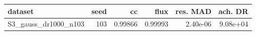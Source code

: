 \begin{tabular}{lrrrrr}
\toprule
dataset & seed & cc & flux & res. MAD & ach. DR \\
\midrule
S3\_gauss\_dr1000\_n103 & 103 & 0.99866 & 0.99993 & 2.40e-06 & 9.08e+04 \\
\bottomrule
\end{tabular}